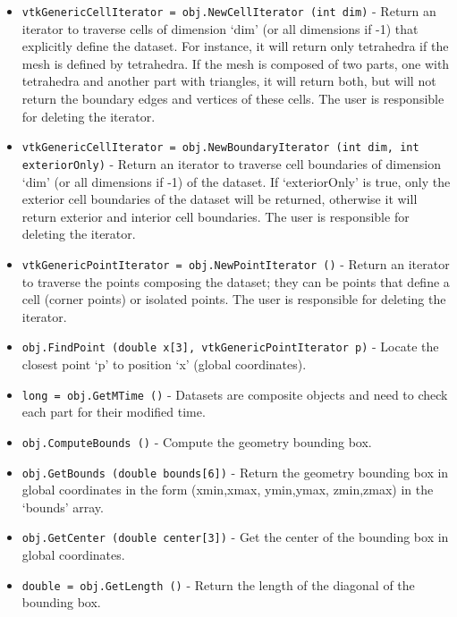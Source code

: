 \begin{itemize}
\item  \verb|vtkGenericCellIterator = obj.NewCellIterator (int dim)| -  Return an iterator to traverse cells of dimension `dim' (or all
 dimensions if -1) that explicitly define the dataset. For instance, it
 will return only tetrahedra if the mesh is defined by tetrahedra. If the
 mesh is composed of two parts, one with tetrahedra and another part with
 triangles, it will return both, but will not return the boundary edges
 and vertices of these cells. The user is responsible for deleting the
 iterator.
 
 

\item  \verb|vtkGenericCellIterator = obj.NewBoundaryIterator (int dim, int exteriorOnly)| -  Return an iterator to traverse cell boundaries of dimension `dim' (or
 all dimensions if -1) of the dataset.  If `exteriorOnly' is true, only
 the exterior cell boundaries of the dataset will be returned, otherwise
 it will return exterior and interior cell boundaries. The user is
 responsible for deleting the iterator.
 
 

\item  \verb|vtkGenericPointIterator = obj.NewPointIterator ()| -  Return an iterator to traverse the points composing the dataset; they
 can be points that define a cell (corner points) or isolated points.
 The user is responsible for deleting the iterator.
 

\item  \verb|obj.FindPoint (double x[3], vtkGenericPointIterator p)| -  Locate the closest point `p' to position `x' (global coordinates).
 
 

\item  \verb|long = obj.GetMTime ()| -  Datasets are composite objects and need to check each part for their
 modified time.

\item  \verb|obj.ComputeBounds ()| -  Compute the geometry bounding box.

\item  \verb|obj.GetBounds (double bounds[6])| -  Return the geometry bounding box in global coordinates in
 the form (xmin,xmax, ymin,ymax, zmin,zmax) in the `bounds' array.

\item  \verb|obj.GetCenter (double center[3])| -  Get the center of the bounding box in global coordinates.

\item  \verb|double = obj.GetLength ()| -  Return the length of the diagonal of the bounding box.
 


\end{itemize}
